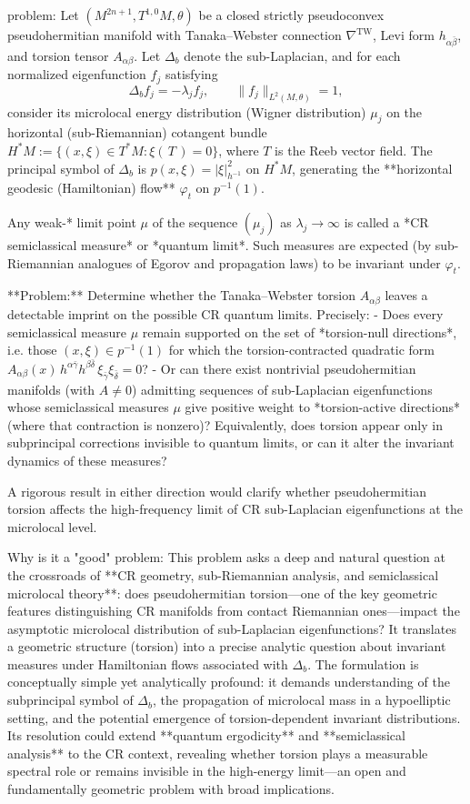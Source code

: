problem:  
Let \((M^{2n+1}, T^{1,0}M, \theta)\) be a closed strictly pseudoconvex pseudohermitian manifold with Tanaka–Webster connection \(\nabla^{\mathrm{TW}}\), Levi form \(h_{\alpha\bar\beta}\), and torsion tensor \(A_{\alpha\beta}\).  
Let \(\Delta_b\) denote the sub-Laplacian, and for each normalized eigenfunction \(f_j\) satisfying  
\[
\Delta_b f_j = -\lambda_j f_j, \qquad \|f_j\|_{L^2(M,\theta)} = 1,
\]
consider its microlocal energy distribution (Wigner distribution) \(\mu_j\) on the horizontal (sub-Riemannian) cotangent bundle \(H^*M := \{(x,\xi)\in T^*M : \xi(\,T\,)=0\}\), where \(T\) is the Reeb vector field.  
The principal symbol of \(\Delta_b\) is \(p(x,\xi) = |\xi|_{h^{-1}}^2\) on \(H^*M\), generating the **horizontal geodesic (Hamiltonian) flow** \(\varphi_t\) on \(p^{-1}(1)\).

Any weak-* limit point \(\mu\) of the sequence \((\mu_j)\) as \(\lambda_j\to\infty\) is called a *CR semiclassical measure* or *quantum limit*.  
Such measures are expected (by sub-Riemannian analogues of Egorov and propagation laws) to be invariant under \(\varphi_t\).

**Problem:**  
Determine whether the Tanaka–Webster torsion \(A_{\alpha\beta}\) leaves a detectable imprint on the possible CR quantum limits.  
Precisely:
- Does every semiclassical measure \(\mu\) remain supported on the set of *torsion-null directions*, i.e. those \((x,\xi)\in p^{-1}(1)\) for which the torsion-contracted quadratic form \(A_{\alpha\beta}(x)\, h^{\alpha\bar\gamma}h^{\beta\bar\delta}\,\xi_{\bar\gamma}\xi_{\bar\delta}=0\)?  
- Or can there exist nontrivial pseudohermitian manifolds (with \(A\neq 0\)) admitting sequences of sub-Laplacian eigenfunctions whose semiclassical measures \(\mu\) give positive weight to *torsion-active directions* (where that contraction is nonzero)?  
Equivalently, does torsion appear only in subprincipal corrections invisible to quantum limits, or can it alter the invariant dynamics of these measures?  

A rigorous result in either direction would clarify whether pseudohermitian torsion affects the high-frequency limit of CR sub-Laplacian eigenfunctions at the microlocal level.

Why is it a "good" problem:  
This problem asks a deep and natural question at the crossroads of **CR geometry, sub-Riemannian analysis, and semiclassical microlocal theory**: does pseudohermitian torsion—one of the key geometric features distinguishing CR manifolds from contact Riemannian ones—impact the asymptotic microlocal distribution of sub-Laplacian eigenfunctions?  
It translates a geometric structure (torsion) into a precise analytic question about invariant measures under Hamiltonian flows associated with \(\Delta_b\).  
The formulation is conceptually simple yet analytically profound: it demands understanding of the subprincipal symbol of \(\Delta_b\), the propagation of microlocal mass in a hypoelliptic setting, and the potential emergence of torsion-dependent invariant distributions.  
Its resolution could extend **quantum ergodicity** and **semiclassical analysis** to the CR context, revealing whether torsion plays a measurable spectral role or remains invisible in the high-energy limit—an open and fundamentally geometric problem with broad implications.